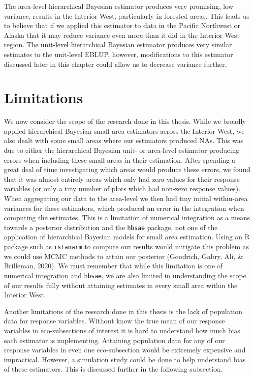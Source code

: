 \documentclass[12pt,twoside]{reedthesis}
\begin{document}
The area-level hierarchical Bayesian estimator produces very promising, low variance, results in the Interior West, particularly in forested areas. This leads us to believe that if we applied this estimator to data in the Pacific Northwest or Alaska that it may reduce variance even more than it did in the Interior West region. The unit-level hierarchical Bayesian estimator produces very similar estimates to the unit-level EBLUP, however, modifications to this estimator discussed later in this chapter could allow us to decrease variance further.

\hypertarget{limitations}{%
\section{Limitations}\label{limitations}}

We now consider the scope of the research done in this thesis. While we broadly applied hierarchical Bayesian small area estimators across the Interior West, we also dealt with some small areas where our estimators produced NAs. This was due to either the hierarchical Bayesian unit- or area-level estimator producing errors when including these small areas in their estimation. After spending a great deal of time investigating which areas would produce these errors, we found that it was almost entirely areas which only had zero values for their response variables (or only a tiny number of plots which had non-zero response values). When aggregating our data to the area-level we then had tiny initial within-area variances for these estimators, which produced an error in the integration when computing the estimates. This is a limitation of numerical integration as a means towards a posterior distribution and the \texttt{hbsae} package, not one of the application of hierarchical Bayesian models for small area estimation. Using an R package such as \texttt{rstanarm} to compute our results would mitigate this problem as we could use MCMC methods to attain our posterior (Goodrich, Gabry, Ali, \& Brilleman, 2020). We must remember that while this limitation is one of numerical integration and \texttt{hbsae}, we are also limited in understanding the scope of our results fully without attaining estimates in every small area within the Interior West.

Another limitations of the research done in this thesis is the lack of population data for response variables. Without know the true mean of our response variables in eco-subsections of interest it is hard to understand how much bias each estimator is implementing. Attaining population data for any of our response variables in even one eco-subsection would be extremely expensive and impractical. However, a simulation study could be done to help understand bias of these estimators. This is discussed further in the following subsection.
\end{document}
